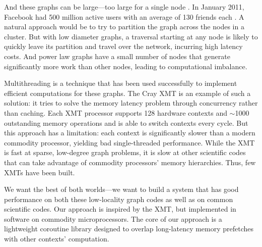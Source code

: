 \documentclass{acm_proc_article-sp}
\begin{document}
And these graphs can be large---too large for a single node . In January 2011, Facebook had 500 million active users with an average of
130 friends each \cite{Facebook:2011p91}. A natural approach would be
to try to partition the graph across the nodes in a cluster. But with
low diameter graphs, a traversal starting at any node is likely to
quickly leave its partition and travel over the network, incurring
high latency costs. And power law graphs have a small number of nodes
that generate significantly more work than other nodes, leading to
computational imbalance.



Multithreading is a technique that has been used successfully to
implement efficient computations for these graphs. The Cray XMT is an
example of such a solution: it tries to solve the memory latency
problem through concurrency rather than caching. Each XMT processor
supports 128 hardware contexts and $\sim$1000 outstanding memory
operations and is able to switch contexts every cycle. But this
approach has a limitation: each context is significantly slower than a
modern commodity processor, yielding bad single-threaded
performance. While the XMT is fast at sparse, low-degree graph
problems, it is slow at other scientific codes that can take advantage
of commodity processors' memory hierarchies. Thus, few XMTs have been
built.

We want the best of both worlds---we want to build a system that has
good performance on both these low-locality graph codes as well as on
common scientific codes. Our approach is inspired by the XMT, but
implemented in software on commodity microprocessors. The core of our
approach is a lightweight coroutine library designed to overlap
long-latency memory prefetches with other contexts' computation. 


\end{document}
